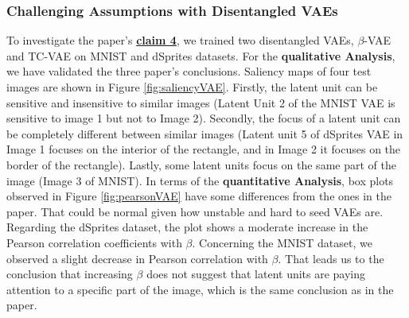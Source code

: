 \subsubsection{Challenging Assumptions with Disentangled VAEs} 
 To investigate the paper's \textbf{\hyperref[claim4]{claim 4}}, we trained two disentangled VAEs, $\beta$-VAE and TC-VAE on MNIST and dSprites datasets.
 For the \textbf{qualitative Analysis}, we have validated the three paper's conclusions. Saliency maps of four test images are shown in Figure \ref{fig:saliencyVAE}. Firstly, the latent unit can be sensitive and insensitive to similar images (Latent Unit 2 of the MNIST VAE is sensitive to image 1 but not to Image 2). Secondly, the focus of a latent unit can be completely different between similar images (Latent unit 5 of dSprites VAE in Image 1 focuses on the interior of the rectangle, and in Image 2 it focuses on the border of the rectangle). Lastly, some latent units focus on the same part of the image  (Image 3 of MNIST). In terms of the \textbf{quantitative Analysis}, box plots observed in Figure \ref{fig:pearsonVAE} have some differences from the ones in the paper. That could be normal given how unstable and hard to seed VAEs are. Regarding the dSprites dataset, the plot shows a moderate increase in the Pearson correlation coefficients with $\beta$. Concerning the MNIST dataset, we observed a slight decrease in Pearson correlation with $\beta$. That leads us to the conclusion that increasing $\beta$ does not suggest that latent units are paying attention to a specific part of the image, which is the same conclusion as in the paper.


